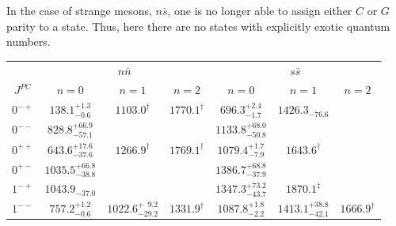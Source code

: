 In the case of strange mesons, $n\bar{s}$, one is no longer able to assign either $C$ or $G$ 
parity to a state. Thus, here there are no states with explicitly exotic quantum numbers.
\begin{table}[!th]
\renewcommand{\arraystretch}{1.3}
\begin{tabular}{c|ccc|ccc|}
\hline
\hline
                            & \multicolumn{3}{c|}{$n\bar{n}   $}                                                         & \multicolumn{3}{c|}{$s\bar{s}$}  \\
$J^{PC}$                    & $n=0$                                &   $n=1$                            &          $n=2$ & $n=0$                     &   $n=1$                   &          $n=2$    \\
\hline                                                                                                                                                                                                     
$0^{-+}$                    & $138.1^{+1.3}_{-0.6}$                &   $1103.0^\dag$                    &  $1770.1^\dag$ &  $696.3^{+2.4}_{-1.7}$    &  $1426.3_{-76.6}$         &                   \\
$0^{--}$                    & $828.8^{+66.9}_{-57.1}$              &                                    &                &  $1133.8^{+68.0}_{-50.8}$ &                           &                   \\
$0^{++}$                    & $643.6^{+17.6}_{-37.6}$              &   $1266.9^\dag$                    &  $1769.1^\dag$ &  $1079.4^{+1.7}_{-7.9}$   &  $1643.6^\dag$            &                   \\
$0^{+-}$                    & $1035.5^{+66.8}_{-38.8}$             &                                    &                &  $1386.7^{+68.8}_{-37.9}$ &                           &                   \\
\hline                                                                                                                                                                                                     
$1^{-+}$                    & $1043.9_{-37.0}$                     &                                    &                &  $1347.3^{+73.2}_{-43.7}$ &  $1870.1^{\ddag}$         &                   \\
$1^{--}$                    & $757.2^{+1.2}_{-0.6}$                & $1022.6^{+\phantom{1}9.2}_{-29.2}$ & $1331.9^\dag$  &  $1087.8^{+1.8}_{-2.2}$   &  $1413.1^{+38.8}_{-42.1}$ &   $1666.9^\dag$   \\                                                                                                                                                                       

\end{tabular}
\end{table}
